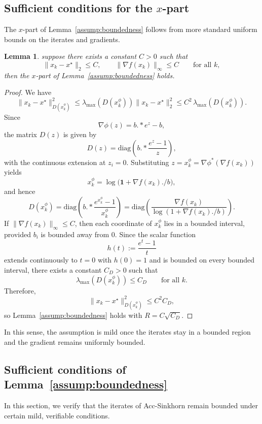 \documentclass{article}
\theoremstyle{plain}
\newtheorem{lemma}{Lemma}
\theoremstyle{remark}
\begin{document}
\subsection{Sufficient conditions for the \texorpdfstring{$x$}{x}-part}
The $x$-part of Lemma~\ref{assump:boundedness} follows from more standard uniform bounds on the iterates and gradients. 
\begin{lemma}
suppose there exists a constant $C>0$ such that
$$
\|x_k-x^\star\|_2\le C,
\qquad
\|\nabla f(x_k)\|_\infty\le C
\qquad\text{for all }k,
$$
then the $x$-part of Lemma~\ref{assump:boundedness} holds.
\end{lemma}
\begin{proof}
We have
$$
\|x_k-x^\star\|_{D(x_k^\phi)}^2
\le \lambda_{\max}(D(x_k^\phi))\|x_k-x^\star\|_2^2
\le C^2\,\lambda_{\max}(D(x_k^\phi)).
$$
Since
$$
\nabla\phi(z)=b.*e^z-b,
$$
the matrix $D(z)$ is given by
$$
D(z)=\mathrm{diag}\!\left(b.*\frac{e^z-1}{z}\right),
$$
with the continuous extension at $z_i=0$. Substituting $z=x_k^\phi=\nabla\phi^*(\nabla f(x_k))$ yields
$$
x_k^\phi=\log\!\bigl(\mathbf{1}+\nabla f(x_k)./b\bigr),
$$
and hence
$$
D(x_k^\phi)=\mathrm{diag}\!\left(b.*\frac{e^{x_k^\phi}-1}{x_k^\phi}\right)
=\mathrm{diag}\!\left(\frac{\nabla f(x_k)}{\log(1+\nabla f(x_k)./b)}\right).
$$
If $\|\nabla f(x_k)\|_\infty\le C$, then each coordinate of $x_k^\phi$ lies in a bounded interval, provided $b_i$ is bounded away from $0$. Since the scalar function
$$
h(t):=\frac{e^t-1}{t}
$$
extends continuously to $t=0$ with $h(0)=1$ and is bounded on every bounded interval, there exists a constant $C_D>0$ such that
$$
\lambda_{\max}(D(x_k^\phi))\le C_D
\qquad\text{for all }k.
$$
Therefore,
$$
\|x_k-x^\star\|_{D(x_k^\phi)}^2\le C^2 C_D,
$$
so Lemma~\ref{assump:boundedness} holds with $R=C\sqrt{C_D}$.
\end{proof}
 In this sense, the assumption is mild once the iterates stay in a bounded region and the gradient remains uniformly bounded.

\subsection{Sufficient conditions of Lemma~\ref{assump:boundedness} }
\label{app:boundedness-iterates}
In this section, we verify that the iterates of Acc-Sinkhorn remain bounded under certain mild, verifiable conditions.



\end{document}
